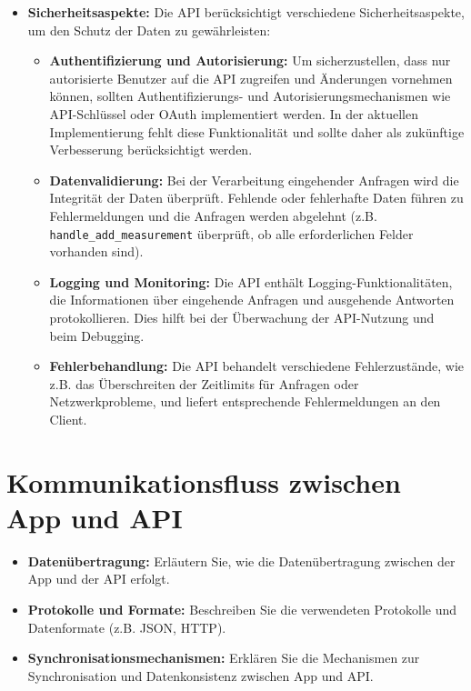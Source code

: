 \begin{itemize}
    \item \textbf{Sicherheitsaspekte:} Die API berücksichtigt verschiedene Sicherheitsaspekte, um den Schutz der Daten zu gewährleisten:
        \begin{itemize}
            \item \textbf{Authentifizierung und Autorisierung:} Um sicherzustellen, dass nur autorisierte Benutzer auf die API zugreifen und Änderungen vornehmen können, sollten Authentifizierungs- und Autorisierungsmechanismen wie API-Schlüssel oder OAuth implementiert werden. In der aktuellen Implementierung fehlt diese Funktionalität und sollte daher als zukünftige Verbesserung berücksichtigt werden.
            \item \textbf{Datenvalidierung:} Bei der Verarbeitung eingehender Anfragen wird die Integrität der Daten überprüft. Fehlende oder fehlerhafte Daten führen zu Fehlermeldungen und die Anfragen werden abgelehnt (z.B. \texttt{handle\_add\_measurement} überprüft, ob alle erforderlichen Felder vorhanden sind).
            \item \textbf{Logging und Monitoring:} Die API enthält Logging-Funktionalitäten, die Informationen über eingehende Anfragen und ausgehende Antworten protokollieren. Dies hilft bei der Überwachung der API-Nutzung und beim Debugging.
            \item \textbf{Fehlerbehandlung:} Die API behandelt verschiedene Fehlerzustände, wie z.B. das Überschreiten der Zeitlimits für Anfragen oder Netzwerkprobleme, und liefert entsprechende Fehlermeldungen an den Client.
        \end{itemize}
\end{itemize}


\section{Kommunikationsfluss zwischen App und API}
\begin{itemize}
    \item \textbf{Datenübertragung:} Erläutern Sie, wie die Datenübertragung zwischen der App und der API erfolgt.
    \item \textbf{Protokolle und Formate:} Beschreiben Sie die verwendeten Protokolle und Datenformate (z.B. JSON, HTTP).
    \item \textbf{Synchronisationsmechanismen:} Erklären Sie die Mechanismen zur Synchronisation und Datenkonsistenz zwischen App und API.
\end{itemize}

